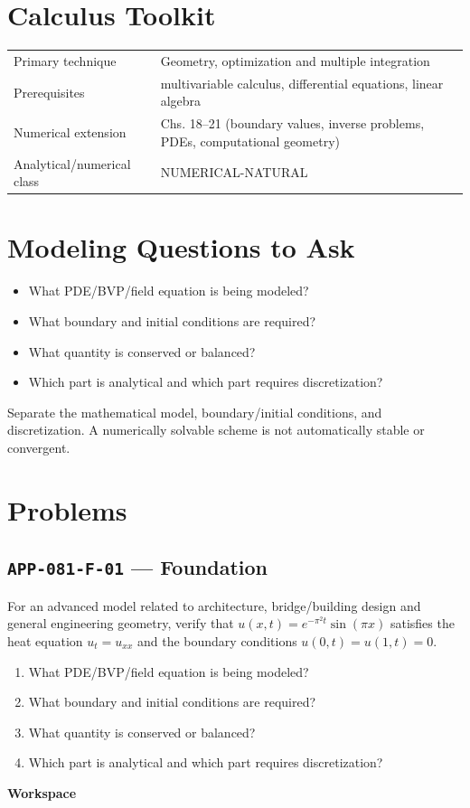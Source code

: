 \documentclass[11pt]{book}
\newcommand{\pid}[1]{\texttt{#1}}
\newcommand{\workspace}{\par\vspace{0.7in}\hrulefill\par\vspace{0.55in}\hrulefill\par}
\begin{document}
\section*{Calculus Toolkit}
\begin{tabularx}{\textwidth}{@{}lX@{}}\toprule
Primary technique & Geometry, optimization and multiple integration \\
Prerequisites & multivariable calculus, differential equations, linear algebra \\
Numerical extension & Chs. 18–21 (boundary values, inverse problems, PDEs, computational geometry) \\
Analytical/numerical class & NUMERICAL-NATURAL \\
\bottomrule\end{tabularx}
\section*{Modeling Questions to Ask}\begin{itemize}
\item What PDE/BVP/field equation is being modeled?
\item What boundary and initial conditions are required?
\item What quantity is conserved or balanced?
\item Which part is analytical and which part requires discretization?
\end{itemize}
\begin{errorbox}Separate the mathematical model, boundary/initial conditions, and discretization. A numerically solvable scheme is not automatically stable or convergent.\end{errorbox}
\section*{Problems}
\subsection*{\pid{APP-081-F-01} — Foundation}
\begin{problembox}
For an advanced model related to architecture, bridge/building design and general engineering geometry, verify that $u(x,t)=e^{-\pi^2t}\sin(\pi x)$ satisfies the heat equation $u_t=u_{xx}$ and the boundary conditions $u(0,t)=u(1,t)=0$.
\end{problembox}
\begin{promptbox}\begin{enumerate}
\item What PDE/BVP/field equation is being modeled?
\item What boundary and initial conditions are required?
\item What quantity is conserved or balanced?
\item Which part is analytical and which part requires discretization?
\end{enumerate}\end{promptbox}
\textbf{Workspace}\workspace
{}
\end{document}
